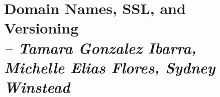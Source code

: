 \chapter{Domain Names, SSL, and Versioning \\
\small{\textit{-- Tamara Gonzalez Ibarra, Michelle Elias Flores, Sydney Winstead}}
\label{Chapter::itDomainNames}}